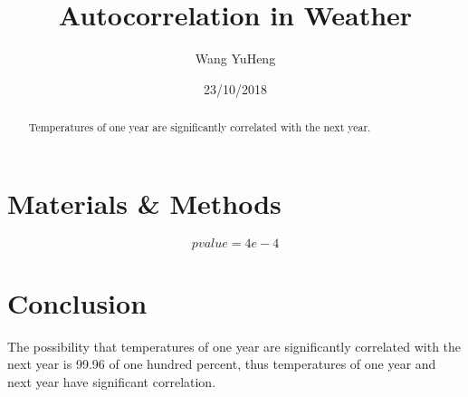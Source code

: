 \documentclass{article}
\title{Autocorrelation in Weather}
\author{Wang YuHeng}
\date{23/10/2018}
\begin{document}
  \maketitle
  
  \begin{abstract}
    Temperatures of one year are significantly correlated with the next year. 
  \end{abstract}

  \section{Materials \& Methods}

  \begin{equation}
    pvalue = 4e-4
  \end{equation}
  \section{Conclusion}
    The possibility that temperatures of one year are significantly correlated with the next year is 99.96 of one hundred percent, thus temperatures of one year and next year have significant correlation.
\end{document}
